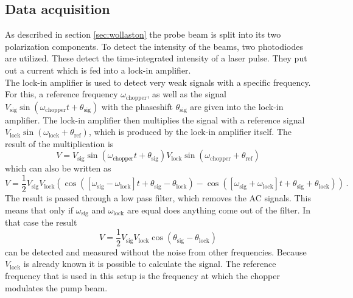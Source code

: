 \subsection{Data acquisition}
\label{sec:data_acq}
As described in section \ref{sec:wollaston} the probe beam is split into its two polarization components.
To detect the intensity of the beams, two photodiodes are utilized.
These detect the time-integrated intensity of a laser pulse.
They put out a current which is fed into a lock-in amplifier.
\\
The lock-in amplifier is used to detect very weak signals with a specific frequency.
For this, a reference frequency $\omega_\text{chopper}$, as well as the signal $V_\text{sig}\sin(\omega_\text{chopper}t + \theta_\text{sig})$ with the phaseshift $\theta_\text{sig}$ are given into the lock-in amplifier.
The lock-in amplifier then multiplies the signal with a reference signal $V_\text{lock}\sin(\omega_\text{lock} + \theta_\text{ref})$, which is produced by the lock-in amplifier itself.
The result of the multiplication is
\begin{equation}
    V = V_\text{sig}\sin(\omega_\text{chopper}t + \theta_\text{sig})V_\text{lock}\sin(\omega_\text{chopper} + \theta_\text{ref})
\end{equation}
which can also be written as 
\begin{equation}
    V = \frac{1}{2} V_\text{sig} V_\text{lock} \left ( \cos([\omega_\text{sig} - \omega_\text{lock}]t +\theta_\text{sig} - \theta_\text{lock}) - \cos([\omega_\text{sig} + \omega_\text{lock}]t +\theta_\text{sig} + \theta_\text{lock})\right ) \, .
\end{equation}
The result is passed through a low pass filter, which removes the AC signals.
This means that only if $\omega_\text{sig}$ and $\omega_\text{lock}$ are equal does anything come out of the filter.
In that case the result 
\begin{equation}
    V = \frac{1}{2}V_\text{sig}V_\text{lock}\cos(\theta_\text{sig}-\theta_\text{lock})
\end{equation} 
can be detected and measured without the noise from other frequencies.
Because $V_\text{lock}$ is already known it is possible to calculate the signal.
The reference frequency that is used in this setup is the frequency at which the chopper modulates the pump beam.
